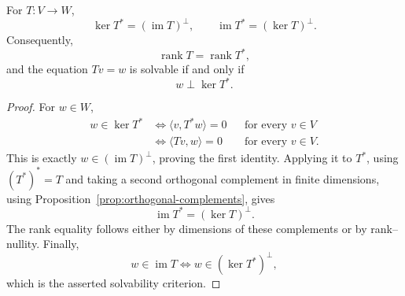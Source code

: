 \begin{theorem}\label{thm:kernels-images-adjoints}
For \(T:V\to W\),
\[
\ker T^*=(\operatorname{im}T)^\perp,
\qquad
\operatorname{im}T^*=(\ker T)^\perp.
\]
Consequently,
\[
\operatorname{rank}T=\operatorname{rank}T^*,
\]
and the equation \(Tv=w\) is solvable if and only if
\[
w\perp\ker T^*.
\]
\end{theorem}
\begin{proof}
For \(w\in W\),
\[
\begin{aligned}
w\in\ker T^*
&\Longleftrightarrow
\langle v,T^*w\rangle=0
&&\text{for every }v\in V \\
&\Longleftrightarrow
\langle Tv,w\rangle=0
&&\text{for every }v\in V.
\end{aligned}
\]
This is exactly \(w\in(\operatorname{im}T)^\perp\), proving the first
identity. Applying it to \(T^*\), using \((T^*)^*=T\) and taking a second
orthogonal complement in finite dimensions, using
Proposition~\ref{prop:orthogonal-complements}, gives
\[
\operatorname{im}T^*=(\ker T)^\perp.
\]
The rank equality follows either by dimensions of these complements or by
rank--nullity. Finally,
\[
w\in\operatorname{im}T
\Longleftrightarrow
w\in(\ker T^*)^\perp,
\]
which is the asserted solvability criterion.
\end{proof}


